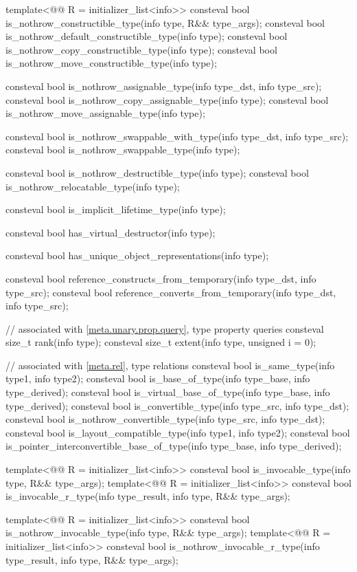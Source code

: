 \begin{codeblock}
{  template<@@ R = initializer_list<info>>
    consteval bool is_nothrow_constructible_type(info type, R&& type_args);
  consteval bool is_nothrow_default_constructible_type(info type);
  consteval bool is_nothrow_copy_constructible_type(info type);
  consteval bool is_nothrow_move_constructible_type(info type);

  consteval bool is_nothrow_assignable_type(info type_dst, info type_src);
  consteval bool is_nothrow_copy_assignable_type(info type);
  consteval bool is_nothrow_move_assignable_type(info type);

  consteval bool is_nothrow_swappable_with_type(info type_dst, info type_src);
  consteval bool is_nothrow_swappable_type(info type);

  consteval bool is_nothrow_destructible_type(info type);
  consteval bool is_nothrow_relocatable_type(info type);

  consteval bool is_implicit_lifetime_type(info type);

  consteval bool has_virtual_destructor(info type);

  consteval bool has_unique_object_representations(info type);

  consteval bool reference_constructs_from_temporary(info type_dst, info type_src);
  consteval bool reference_converts_from_temporary(info type_dst, info type_src);

  // associated with \ref{meta.unary.prop.query}, type property queries
  consteval size_t rank(info type);
  consteval size_t extent(info type, unsigned i = 0);

  // associated with \ref{meta.rel}, type relations
  consteval bool is_same_type(info type1, info type2);
  consteval bool is_base_of_type(info type_base, info type_derived);
  consteval bool is_virtual_base_of_type(info type_base, info type_derived);
  consteval bool is_convertible_type(info type_src, info type_dst);
  consteval bool is_nothrow_convertible_type(info type_src, info type_dst);
  consteval bool is_layout_compatible_type(info type1, info type2);
  consteval bool is_pointer_interconvertible_base_of_type(info type_base, info type_derived);

  template<@@ R = initializer_list<info>>
    consteval bool is_invocable_type(info type, R&& type_args);
  template<@@ R = initializer_list<info>>
    consteval bool is_invocable_r_type(info type_result, info type, R&& type_args);

  template<@@ R = initializer_list<info>>
    consteval bool is_nothrow_invocable_type(info type, R&& type_args);
  template<@@ R = initializer_list<info>>
    consteval bool is_nothrow_invocable_r_type(info type_result, info type, R&& type_args);

}
\end{codeblock}
